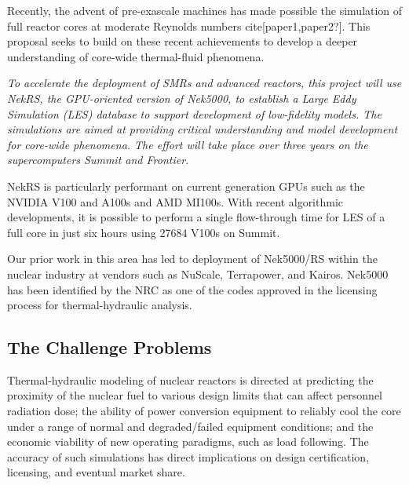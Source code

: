 Recently, the advent of pre-exascale machines has made possible the simulation
of full reactor cores at moderate Reynolds numbers cite[paper1,paper2?].  This
proposal seeks to build on these recent achievements to develop a deeper
understanding of core-wide thermal-fluid phenomena.

{\em
To accelerate the deployment of SMRs and advanced reactors, this project will
use NekRS, the GPU-oriented version of Nek5000, to establish a Large Eddy
Simulation (LES) database to support development of low-fidelity models.  
The simulations are aimed at providing critical understanding and model
development for core-wide phenomena.  The effort will take place over three
years on the supercomputers Summit and Frontier.

NekRS is particularly performant on current generation GPUs such as the NVIDIA
V100 and A100s and AMD MI100s.  With recent algorithmic developments, it is possible 
to perform a single flow-through time for LES of a full core in just six hours 
using 27684 V100s on Summit.

Our prior work in this area has led to deployment of Nek5000/RS within the 
nuclear industry at vendors such as NuScale, Terrapower, and Kairos.
Nek5000 has been identified by the NRC as one of the codes approved 
in the licensing process for thermal-hydraulic analysis.
}


\vspace{-.25in} \subsection{The Challenge Problems}
\vspace{-.2in}


Thermal-hydraulic modeling of nuclear reactors is directed at predicting the
proximity of the nuclear fuel to various design limits that can affect
personnel radiation dose; the ability of power conversion equipment to reliably
cool the core under a range of normal and degraded/failed equipment conditions;
and the economic viability of new operating paradigms, such as load following.
The accuracy of such simulations has direct implications on design
certification, licensing, and eventual market share. 

